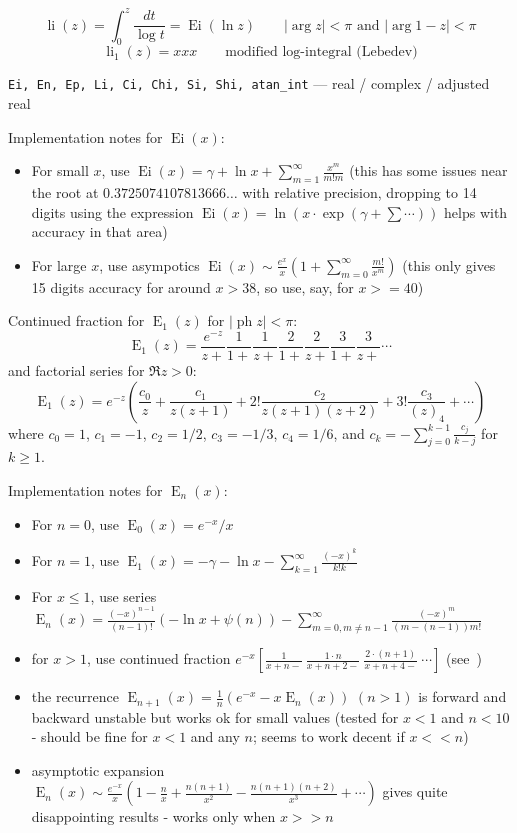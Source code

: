 \documentclass[10pt,dvipdfmx,letterpaper,twoside]{article}
\let\O=\operatorname
\newenvironment{implementation}{\noindent\begin{framed}}{\end{framed}}
\begin{document}
\[ \O{li}(z) = \int_{0}^z\frac{dt}{\log t} = \O{Ei}(\ln z) \qquad\text{$|\arg z|<\pi$ and $|\arg 1-z|<\pi$} \]
\[ \O{li}_1(z) = xxx  \qquad\text{modified log-integral (Lebedev)}\]

{\tt Ei, En, Ep, Li, Ci, Chi, Si, Shi, atan\_int} --- real / complex / adjusted real

\begin{implementation}
Implementation notes for $\O{Ei}(x)$:
\begin{itemize}
\item For small $x$, use $\O{Ei}(x) = \gamma + \ln x + \sum_{m=1}^\infty \frac{x^m}{m! m}$
  (this has some issues near the root at $0.3725074107813666\dots$ with relative precision, dropping to 14 digits
  using the expression $\O{Ei}(x) = \ln(x\cdot\exp(\gamma + \sum\cdots))$ helps with accuracy in that area)
\item For large $x$, use asympotics $\O{Ei}(x) \sim \frac{e^x}{x}(1 + \sum_{m=0}^\infty\frac{m!}{x^m})$
  (this only gives 15 digits accuracy for around $x>38$, so use, say, for $x>=40$)
\end{itemize}
\end{implementation}

Continued fraction for $\O{E}_1(z)$ for $|\O{ph} z|<\pi$:
\[ \O{E}_1(z) = \frac{e^{-z}}{z +} \frac{1}{1 +} \frac{1}{z +} \frac{2}{1 +} \frac{2}{z +} \frac{3}{1 +} \frac{3}{z +} \cdots \]
and factorial series for $\Re z>0$:
\[ \O{E}_1(z) = e^{-z}\left( \frac{c_0}{z} + \frac{c_1}{z(z+1)} + 2!\frac{c_2}{z(z+1)(z+2)} + 3!\frac{c_3}{(z)_4} + \cdots \right) \]
where $c_0=1$, $c_1=-1$, $c_2=1/2$, $c_3=-1/3$, $c_4=1/6$, and $c_k=-\sum_{j=0}^{k-1}\tfrac{c_j}{k-j}$ for $k\geq1$.

\begin{implementation}
Implementation notes for $\O{E}_n(x)$:
\begin{itemize}
\item For $n=0$, use $\O{E}_0(x) = e^{-x}/x$
\item For $n=1$, use $\O{E}_1(x) = -\gamma - \ln x - \sum_{k=1}^\infty\frac{(-x)^k}{k! k}$
\item For $x\leq1$, use series $\O{E}_n(x) = \frac{(-x)^{n-1}}{(n-1)!}(-\ln x + \psi(n)) - \sum_{m=0,m\neq n-1}^\infty \frac{(-x)^m}{(m-(n-1))m!}$
\item for $x>1$, use continued fraction $e^{-x}\left[\frac{1}{x+n-}\ \frac{1\cdot n}{x+n+2-}\ \frac{2\cdot(n+1)}{x+n+4-}\ \cdots\right]$
  (see~\cite{zj})
\item the recurrence $\O{E}_{n+1}(x) = \frac{1}{n}(e^{-x} - x \O{E}_n(x))$ $(n>1)$ is forward and backward unstable but works ok for small values
  (tested for $x<1$ and $n<10$ - should be fine for $x<1$ and any $n$; seems to work decent if $x<<n$)
\item asymptotic expansion $\O{E}_n(x) \sim \frac{e^{-x}}{x}(1 - \frac{n}{x} + \frac{n(n+1)}{x^2} - \frac{n(n+1)(n+2)}{x^3} + \cdots)$ gives quite
  disappointing results - works only when $x>>n$
\end{itemize}
\end{implementation}
\end{document}
